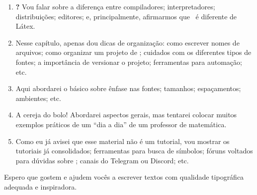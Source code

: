 \begin{enumerate}
  \item {} \textbf{\LaTeXX ?}
        Vou falar sobre a diferença entre compiladores; interpretadores; 
        distribuições; editores; e, principalmente, afirmarmos que \LaTeXX\ é 
        diferente de Látex.
  \item {}
        Nesse capítulo, apenas dou dicas de organização: como escrever nomes de 
        arquivos; como organizar um projeto de \LaTeXX; cuidados com os 
        diferentes tipos de fontes; a importância de versionar o projeto; 
        ferramentas para automação; etc.
  \item {}
        Aqui abordarei o básico sobre ênfase nas fontes; tamanhos; espaçamentos; 
        ambientes; etc.
  \item {}
        A cereja do bolo!
        Abordarei aspectos gerais, mas tentarei colocar muitos exemplos práticos 
        de um ``dia a dia'' de um professor de matemática.
  \item {}
        Como eu já avisei que esse material não é um tutorial, vou mostrar os 
        tutoriais já consolidados; ferramentas para busca de símbolos; fóruns 
        voltados para dúvidas sobre \LaTeXX; canais do Telegram ou Discord; etc.
\end{enumerate}

Espero que gostem e ajudem vocês a escrever textos com qualidade tipográfica 
adequada e inspiradora. 

